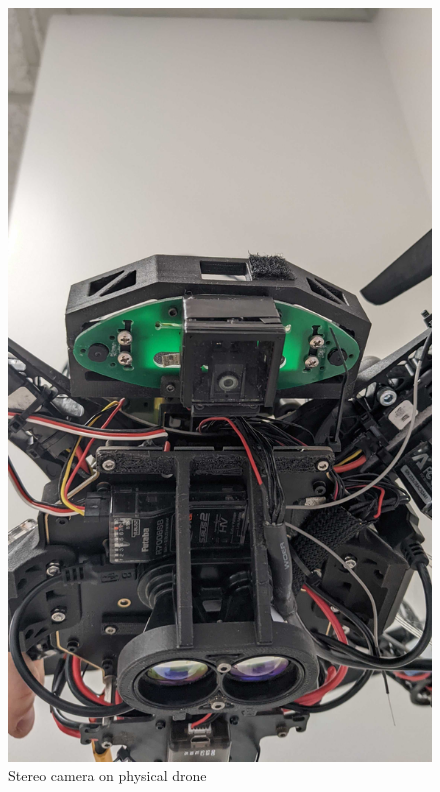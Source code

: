\begin{figure}[h]
    \centering
    \includegraphics[scale=0.5]{images/appendix/Drone/stereo_cam.jpg}
    \caption{Stereo camera on physical drone}
    \label{fig:appendix_stereo_camera_hardware}
    \end{figure}